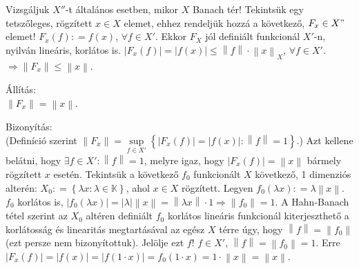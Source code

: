 \documentclass[12pt,a4paper]{scrartcl}
\newenvironment{bizonyitas}{}{}
\newenvironment{allitas}{}{}
\begin{document}
Vizsgáljuk \(X''\)-t általános esetben, mikor \(X\) Banach tér!
Tekintsük egy tetszőleges, rögzített \(x \in X\) elemet, ehhez rendeljük
hozzá a következő, \(F_{x} \in X"\) elemet!
\(F_{x}\left( f \right): = f\left( x \right)\), \(\forall f \in X'\).
Ekkor \(F_{X}\) jól definiált funkcionál \(X'\)-n, nyilván lineáris,
korlátos is.
\(\left| {F_{x}\left( f \right)} \right| = \left| {f\left( x \right)} \right| \leq \left\| f \right\| \cdot \left\| x \right\|_{X}\),
\(\forall f \in X'\).
\(\left. \Rightarrow\left\| F_{x} \right\| \leq \left\| x \right\| \right.\).

\begin{allitas}

Állítás:\\
\(\left\| F_{x} \right\| = \left\| x \right\|\).

\end{allitas}

\begin{bizonyitas}

Bizonyítás:\\
(Definíció szerint
\(\left\| F_{x} \right\| = \sup\limits_{f \in X'}\left\{ {\left| {F_{x}\left( f \right)} \right| = \left| {f\left( x \right)} \right|:\left\| f \right\| = 1} \right\}\).)
Azt kellene belátni, hogy \(\exists f \in X':\left\| f \right\| = 1\),
melyre igaz, hogy
\(\left| {F_{x}\left( f \right)} \right| = \left\| x \right\|\) bármely
rögzített \(x\) esetén. Tekintsük a következő \(f_{0}\) funkcionált
\(X\) következő, 1 dimenziós alterén:
\(X_{0}: = \left\{ {\lambda x:\lambda \in {\mathbb{K}}} \right\}\), ahol
\(x \in X\) rögzített. Legyen
\(f_{0}\left( {\lambda x} \right): = \lambda\left\| x \right\|\).
\(f_{0}\) korlátos is,
\(\left. \left| {f_{0}\left( {\lambda x} \right)} \right| = \left| \lambda \right|\left\| x \right\| = \left\| {\lambda x} \right\| \cdot 1\Rightarrow\left\| f_{0} \right\| = 1 \right.\).
A Hahn-Banach tétel szerint az \(X_{0}\) altéren definiált \(f_{0}\)
korlátos lineáris funkcionál kiterjeszthető a korlátosság és linearitás
megtartásával az egész \(X\) térre úgy, hogy
\(\left\| f \right\| = \left\| f_{0} \right\|\) (ezt persze nem
bizonyítottuk). Jelölje ezt \(f\)! \(f \in X'\),
\(\left\| f \right\| = \left\| f_{0} \right\| = 1\). Erre
\(\left| {F_{x}\left( f \right)} \right| = \left| {f\left( x \right)} \right| = \left| {f\left( {1 \cdot x} \right)} \right| = f_{0}\left( {1 \cdot x} \right) = 1 \cdot \left\| x \right\| = \left\| x \right\|\).

\end{bizonyitas}
\end{document}
